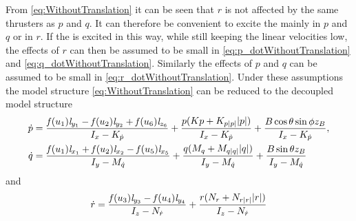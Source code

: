 From \eqref{eq:WithoutTranslation} it can be seen that $r$ is not affected by the same thrusters as $p$ and $q$. It can therefore be convenient to excite the \abbrROV mainly in $p$ and $q$ or in $r$. If the \abbrROV is excited in this way, while still keeping the linear velocities low, the effects of $r$ can then be assumed to be small in \eqref{eq:p_dotWithoutTranslation} and \eqref{eq:q_dotWithoutTranslation}. Similarly the effects of $p$ and $q$ can be assumed to be small in \eqref{eq:r_dotWithoutTranslation}. Under these assumptions the model structure \eqref{eq:WithoutTranslation} can be reduced to the decoupled model structure
\begin{subequations} \label{eq:pq_dot_decouple}
\begin{align} \label{eq:pq_dot_decouple1}
\dot{p} &= \frac{\mathit{f}(u_{1}) \mathit{l}_{y_{1}} - \mathit{f}(u_{2}) \mathit{l}_{y_{2}} + \mathit{f}(u_{6}) \mathit{l}_{z_{6}}}{I_{x} - K_{\dot{p}}} + \frac{p (Kp + K_{p|p|} |p|)}{I_{x} - K_{\dot{p}}} + \frac{B \cos{\theta} \sin{\phi} z_B}{I_{x} - K_{\dot{p}}}, \\ \label{eq:pq_dot_decouple2}
\dot{q} &=\frac{\mathit{f}(u_{1}) \mathit{l}_{x_{1}} + \mathit{f}(u_{2}) \mathit{l}_{x_{2}} - \mathit{f}(u_{5}) \mathit{l}_{x_{5}}}{I_{y} - M_{\dot{q}}} + \frac{q (M_{q} + M_{q|q|} |q|)}{I_{y} - M_{\dot{q}}} + \frac{B \sin{\theta} z_B}{I_{y} - M_{\dot{q}}} 
\end{align}
\end{subequations} and
\begin{equation} \label{eq:r_dot_decouple}
\dot{r} = \frac{\mathit{f}(u_{3}) \mathit{l}_{y_{3}} - \mathit{f}(u_{4}) \mathit{l}_{y_{4}}}{I_{z} - N_{\dot{r}}} + \frac{r (N_{r} + N_{r|r|} |r|)}{I_{z} - N_{\dot{r}}}
\end{equation}

